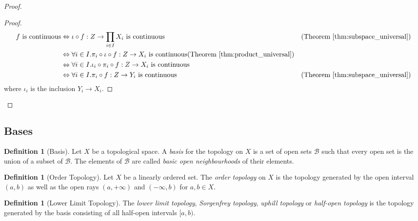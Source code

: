 \documentclass{book}
\let\qed\relax
\theoremstyle{definition}
\newtheorem{df}[ax]{Definition}
\begin{document}
\begin{proof}
\pf
{}
\begin{proof}
	\pf
	\begin{align*}
		f \text{ is continuous}
		& \Leftrightarrow \iota \circ f : Z \rightarrow \prod_{i \in I} X_i \text{ is continuous} & (\text{Theorem \ref{thm:subspace_universal}}) \\
		& \Leftrightarrow \forall i \in I. \pi_i \circ \iota \circ f : Z \rightarrow X_i \text{ is continuous}  (\text{Theorem \ref{thm:product_universal}}) \\
		& \Leftrightarrow \forall i \in I. \iota_i \circ \pi_i \circ f : Z \rightarrow X_i \text{ is continuous} \\
		& \Leftrightarrow \forall i \in I. \pi_i \circ f : Z \rightarrow Y_i \text{ is continuous}
		& (\text{Theorem \ref{thm:subspace_universal}})
	\end{align*}
	where $\iota_i$ is the inclusion $Y_i \rightarrow X_i$.
\end{proof}
\qed
\end{proof}

\subsection{Bases}

\begin{df}[Basis]
Let $X$ be a topological space. A \emph{basis} for the topology on $X$ is a set of open sets $\mathcal{B}$ such that every open set is the union of a subset of $\mathcal{B}$. The elements of $\mathcal{B}$ are called \emph{basic open neighbourhoods} of their elements.
\end{df}

\begin{df}[Order Topology]
Let $X$ be a linearly ordered set. The \emph{order topology} on $X$ is the topology generated by the open interval $(a,b)$ as well as the open rays $(a, + \infty)$ and $(-\infty, b)$ for $a,b \in X$.
\end{df}

\begin{df}[Lower Limit Topology]
The \emph{lower limit topology}, \emph{Sorgenfrey topology}, \emph{uphill topology} or \emph{half-open topology} is the topology generated by the basis consisting of all half-open intervals $[a,b)$.
\end{df}
\end{document}

